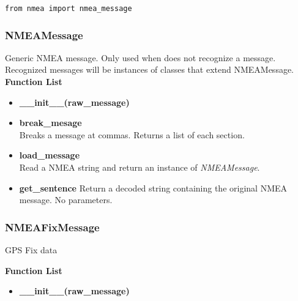 
\begin{verbatim}
from nmea import nmea_message
\end{verbatim}


\subsubsection{NMEAMessage}

Generic NMEA message. Only used when \projname does not recognize a message.
Recognized messages will be instances of classes that extend NMEAMessage. \\

\textbf{Function List}
\begin{itemize}
	
	\item \textbf{\_\_init\_\_(raw\_message)}


	\item \textbf{break\_mesage} \staticmethod {} \\
	Breaks a message at commas. Returns a list of each section.


	\item \textbf{load\_message} \staticmethod {} \\
	Read a NMEA string and return an instance of \emph{NMEAMessage}.


	\item \textbf{get\_sentence} 
	Return a decoded string containing the original NMEA message. No parameters.

\end{itemize}

\subsubsection{NMEAFixMessage}

GPS Fix data

\textbf{Function List}
\begin{itemize}
	
	\item \textbf{\_\_init\_\_(raw\_message)}


\end{itemize}


